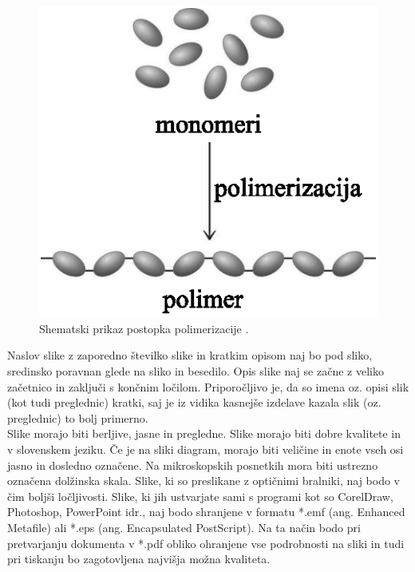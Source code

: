 \begin{figure}[ht!]
\begin{centering}
  \includegraphics[scale=1.0]{slike/neke_molekule}
  \caption{Shematski prikaz postopka polimerizacije \cite{Doe_1991,Bazant_2008}.} \label{fig:neke_molekule}
\end{centering}
\end{figure}

Naslov slike z zaporedno številko slike in kratkim opisom naj bo pod sliko, sredinsko poravnan glede na sliko in besedilo. Opis slike naj se začne z veliko začetnico in zaključi s končnim ločilom. Priporočljivo je, da so imena oz. opisi slik (kot tudi preglednic) kratki, saj je iz vidika kasnejše izdelave kazala slik (oz. preglednic) to bolj primerno.\\

Slike morajo biti berljive, jasne in pregledne. Slike morajo biti dobre kvalitete in v slovenskem jeziku. Če je na sliki diagram, morajo biti veličine in enote vseh osi jasno in dosledno označene. Na mikroskopskih posnetkih mora biti ustrezno označena dolžinska skala. Slike, ki so preslikane z optičnimi bralniki, naj bodo v čim boljši ločljivosti. Slike, ki jih ustvarjate sami s programi kot so CorelDraw, Photoshop, PowerPoint idr., naj bodo shranjene v formatu *.emf (ang. Enhanced Metafile) ali *.eps (ang. Encapsulated PostScript). Na ta način bodo pri pretvarjanju dokumenta v *.pdf obliko ohranjene vse podrobnosti na sliki in tudi pri tiskanju bo zagotovljena najvišja možna kvaliteta.\\


